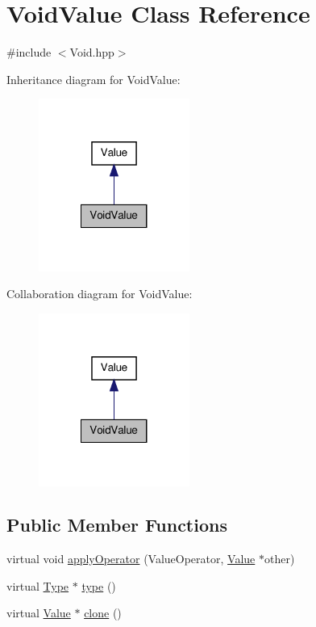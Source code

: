 \hypertarget{class_void_value}{\section{Void\-Value Class Reference}
\label{class_void_value}
}


{\ttfamily \#include $<$Void.\-hpp$>$}



Inheritance diagram for Void\-Value\-:
\nopagebreak
\begin{figure}[H]
\begin{center}
\leavevmode
\includegraphics[width=140pt]{class_void_value__inherit__graph}
\end{center}
\end{figure}


Collaboration diagram for Void\-Value\-:
\nopagebreak
\begin{figure}[H]
\begin{center}
\leavevmode
\includegraphics[width=140pt]{class_void_value__coll__graph}
\end{center}
\end{figure}
\subsection*{Public Member Functions}
\begin{DoxyCompactItemize}
\item 
virtual void \hyperlink{class_void_value_a014a99d46659fdb93e05f59bd58a0665}{apply\-Operator} (Value\-Operator, \hyperlink{class_value}{Value} $\ast$other)
\item 
virtual \hyperlink{class_type}{Type} $\ast$ \hyperlink{class_void_value_ab628d018d3b3041c42b96e5956039dc0}{type} ()
\item 
virtual \hyperlink{class_value}{Value} $\ast$ \hyperlink{class_void_value_a5b22b21d7d4280904656eabb5d5b4c68}{clone} ()
\end{DoxyCompactItemize}


